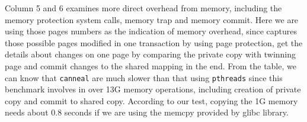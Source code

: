 Column 5 and 6 examines more direct overhead from memory, 
including the memory protection system calls, memory trap and memory commit. 
Here we are using those pages numbers as 
the indication of memory overhead, since \dthreads{}  captures those possible pages modified in one transaction 
by using page protection, 
get the details about changes on one page by comparing the private copy with twinning page and 
commit changes to the shared mapping in the end. 
From the table, we can know that \texttt{canneal} are much slower than that using \texttt{pthreads} since this benchmark 
involves in over 13G memory operations, including creation of private copy and commit to shared copy. According to
our test, copying the 1G memory needs about 0.8 seconds if we are using the memcpy provided by glibc library.

